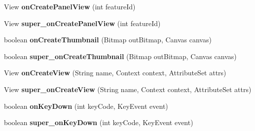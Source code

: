 \begin{DoxyCompactItemize}
View {\bfseries on\+Create\+Panel\+View} (int feature\+Id)
\item 
\mbox{\label{classorg_1_1qtproject_1_1qt5_1_1android_1_1bindings_1_1_qt_activity_ab37f48e1ce50767f29be1cebd4fc96e0}} 
View {\bfseries super\+\_\+on\+Create\+Panel\+View} (int feature\+Id)
\item 
\mbox{\label{classorg_1_1qtproject_1_1qt5_1_1android_1_1bindings_1_1_qt_activity_a961e15fb9b7bcdc7e4310e881656e1d7}} 
boolean {\bfseries on\+Create\+Thumbnail} (Bitmap out\+Bitmap, Canvas canvas)
\item 
\mbox{\label{classorg_1_1qtproject_1_1qt5_1_1android_1_1bindings_1_1_qt_activity_a2af36b766142fa45fa77623e549112ac}} 
boolean {\bfseries super\+\_\+on\+Create\+Thumbnail} (Bitmap out\+Bitmap, Canvas canvas)
\item 
\mbox{\label{classorg_1_1qtproject_1_1qt5_1_1android_1_1bindings_1_1_qt_activity_a4f26e1f33245742068eb9b79689f69e5}} 
View {\bfseries on\+Create\+View} (String name, Context context, Attribute\+Set attrs)
\item 
\mbox{\label{classorg_1_1qtproject_1_1qt5_1_1android_1_1bindings_1_1_qt_activity_a4e054eb047b9531cc8abaa75039136f2}} 
View {\bfseries super\+\_\+on\+Create\+View} (String name, Context context, Attribute\+Set attrs)
\item 
\mbox{\label{classorg_1_1qtproject_1_1qt5_1_1android_1_1bindings_1_1_qt_activity_ac1ee5a8d6b1ed5e7757139be8d7810be}} 
boolean {\bfseries on\+Key\+Down} (int key\+Code, Key\+Event event)
\item 
\mbox{\label{classorg_1_1qtproject_1_1qt5_1_1android_1_1bindings_1_1_qt_activity_af7fbc3d78f28c7599fac81499717ac8d}} 
boolean {\bfseries super\+\_\+on\+Key\+Down} (int key\+Code, Key\+Event event)
\item 

\end{DoxyCompactItemize}
